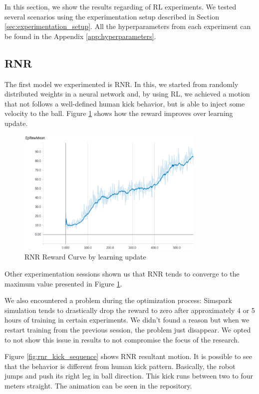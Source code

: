 In this section, we show the results regarding of RL experiments. We tested several scenarios using the experimentation setup described in Section \ref{sec:experimentation_setup}. All the hyperparameters from each experiment can be found in the Appendix \ref{app:hyperparameters}.

\subsection{RNR}

The first model we experimented is RNR. In this, we started from randomly distributed weights in a neural network and, by using RL, we achieved a motion that not follows a well-defined human kick behavior, but is able to inject some velocity to the ball. Figure \ref{fig:rnrreward} shows how the reward improves over learning update.

\begin{figure}[!htbp]
	\centering
	\includegraphics[width=0.8\textwidth]{Cap6/rnrreward.eps}
	\caption{RNR Reward Curve by learning update}
	\label{fig:rnrreward}
\end{figure}

Other experimentation sessions shown us that RNR tends to converge to the maximum value presented in Figure \ref{fig:rnrreward}.

We also encountered a problem during the optimization process: Simspark simulation tends to drastically drop the reward to zero after approximately 4 or 5 hours of training in certain experiments. We didn't found a reason but when we restart training from the previous session, the problem just disappear. We opted to not show this issue in results to not compromise the focus of the research.

Figure \ref{fig:rnr_kick_sequence} shows RNR resultant motion. It is possible to see that the behavior is different from human kick pattern. Basically, the robot jumps and push its right leg in ball direction. This kick runs between two to four meters straight. The animation can be seen in the repository.

